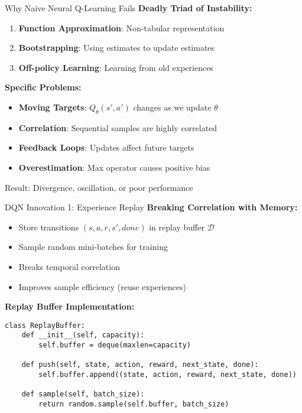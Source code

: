 \documentclass[aspectratio=169,10pt]{beamer}
\begin{document}
\begin{frame}{Why Naive Neural Q-Learning Fails}
\textbf{Deadly Triad of Instability:}
\begin{enumerate}
    \item \textbf{Function Approximation}: Non-tabular representation
    \item \textbf{Bootstrapping}: Using estimates to update estimates
    \item \textbf{Off-policy Learning}: Learning from old experiences
\end{enumerate}

\vspace{0.3cm}
\textbf{Specific Problems:}
\begin{itemize}
    \item \textbf{Moving Targets}: $Q_\theta(s',a')$ changes as we update $\theta$
    \item \textbf{Correlation}: Sequential samples are highly correlated
    \item \textbf{Feedback Loops}: Updates affect future targets
    \item \textbf{Overestimation}: Max operator causes positive bias
\end{itemize}

\vspace{0.3cm}
\alert{Result: Divergence, oscillation, or poor performance}

\end{frame}
\begin{frame}[fragile]{DQN Innovation 1: Experience Replay}
\textbf{Breaking Correlation with Memory:}
\begin{itemize}
    \item Store transitions $(s, a, r, s', done)$ in replay buffer $\mathcal{D}$
    \item Sample random mini-batches for training
    \item Breaks temporal correlation
    \item Improves sample efficiency (reuse experiences)
\end{itemize}

\vspace{0.3cm}
\textbf{Replay Buffer Implementation:}
\begin{lstlisting}
class ReplayBuffer:
    def __init__(self, capacity):
        self.buffer = deque(maxlen=capacity)
    
    def push(self, state, action, reward, next_state, done):
        self.buffer.append((state, action, reward, next_state, done))
    
    def sample(self, batch_size):
        return random.sample(self.buffer, batch_size)
\end{lstlisting}

\end{frame}
\end{document}
